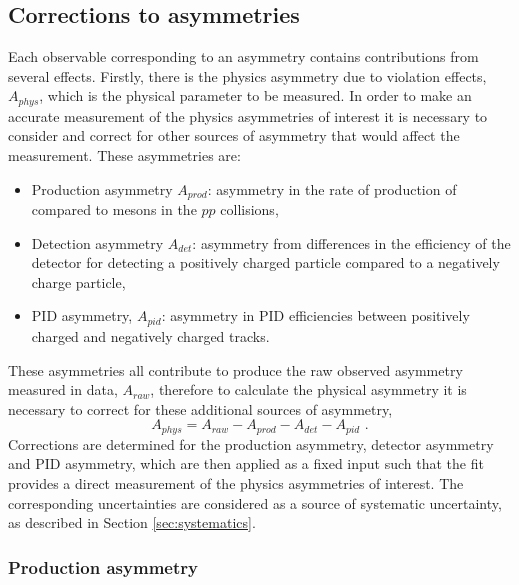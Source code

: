 \subsection{Corrections to asymmetries}
\label{sec:cpfit:asymmetries}

Each \CP observable corresponding to an asymmetry contains contributions from several effects. Firstly, there is the physics asymmetry due to \CP violation effects, $A_{phys}$, which is the physical parameter to be measured. In order to make an accurate measurement of the physics asymmetries of interest it is necessary to consider and correct for other sources of asymmetry that would affect the measurement. These asymmetries are:
\begin{itemize}
\item Production asymmetry $A_{prod}$: asymmetry in the rate of production of \Bp compared to \Bm mesons in the $pp$ collisions,
\item Detection asymmetry $A_{det}$: asymmetry from differences in the efficiency of the detector for detecting a positively charged particle compared to a negatively charge particle,
\item PID asymmetry, $A_{pid}$: asymmetry in PID efficiencies between positively charged and negatively charged tracks.
\end{itemize}
These asymmetries all contribute to produce the raw observed asymmetry measured in data, $A_{raw}$, therefore to calculate the physical asymmetry it is necessary to correct for these additional sources of asymmetry,
\begin{equation}
A_{phys} = A_{raw} - A_{prod} - A_{det} - A_{pid} \text{ .}
\label{asymmetries}
\end{equation} 
Corrections are determined for the production asymmetry, detector asymmetry and PID asymmetry, which are then applied as a fixed input such that the \CP fit provides a direct measurement of the physics asymmetries of interest. The corresponding uncertainties are considered as a source of systematic uncertainty, as described in Section \ref{sec:systematics}.

\subsubsection{Production asymmetry}

